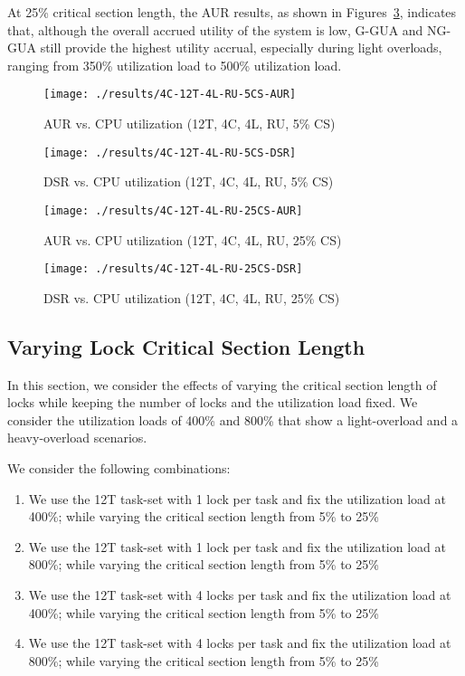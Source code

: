 \documentclass[12pt,dvips]{report}
\begin{document}
At 25\% critical section length, the AUR results, as shown in Figures~\ref{fig:4C-12T-4L-RU-25CS-AUR}, indicates that, although the overall accrued utility of the system is low, G-GUA and NG-GUA still provide the highest utility accrual, especially during light overloads, ranging from 350\% utilization load to 500\% utilization load. 
 
\begin{figure} [htbp]
  \centering
  \texttt{[image: ./results/4C-12T-4L-RU-5CS-AUR]}
  \caption{AUR vs. CPU utilization (12T, 4C, 4L, RU, 5\% CS)}
    \label{fig:4C-12T-4L-RU-5CS-AUR}
\end{figure}
 
\begin{figure} [htbp]
  \centering
  \texttt{[image: ./results/4C-12T-4L-RU-5CS-DSR]}
  \caption{DSR vs. CPU utilization (12T, 4C, 4L, RU, 5\% CS) }
    \label{fig:4C-12T-4L-RU-5CS-DSR}
\end{figure}


\begin{figure} [htbp]
  \centering
  \texttt{[image: ./results/4C-12T-4L-RU-25CS-AUR]}
  \caption{AUR vs. CPU utilization (12T, 4C, 4L, RU, 25\% CS)}
    \label{fig:4C-12T-4L-RU-25CS-AUR}
\end{figure}
 
\begin{figure} [htbp]
  \centering
  \texttt{[image: ./results/4C-12T-4L-RU-25CS-DSR]}
  \caption{DSR vs. CPU utilization (12T, 4C, 4L, RU, 25\% CS)}
    \label{fig:4C-12T-4L-RU-25CS-DSR}
\end{figure}

\pagebreak

\subsection{Varying Lock Critical Section Length}\label{sec:vary-cslen}

In this section, we consider the effects of varying the critical section length of locks while keeping the number of locks and the utilization load fixed. We consider the utilization loads of 400\% and 800\% that show a light-overload and a heavy-overload scenarios.

We consider the following combinations:
\begin{enumerate}
\item We use the 12T task-set with 1 lock per task and fix the utilization load at 400\%; while varying the critical section length from 5\% to 25\%
\item We use the 12T task-set with 1 lock per task and fix the utilization load at 800\%; while varying the critical section length from 5\% to 25\%
\item We use the 12T task-set with 4 locks per task and fix the utilization load at 400\%; while varying the critical section length from 5\% to 25\%
\item We use the 12T task-set with 4 locks per task and fix the utilization load at 800\%; while varying the critical section length from 5\% to 25\%
\end{enumerate}
\end{document}
